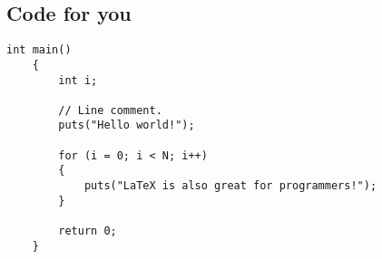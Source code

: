 \subsection{Code for you}
\begin{lstlisting}[frame=single, caption={DemoCode},label=code::sttf]
    int main()
    {
        int i;

        // Line comment.
        puts("Hello world!");

        for (i = 0; i < N; i++)
        {
            puts("LaTeX is also great for programmers!");
        }

        return 0;
    }
\end{lstlisting}
